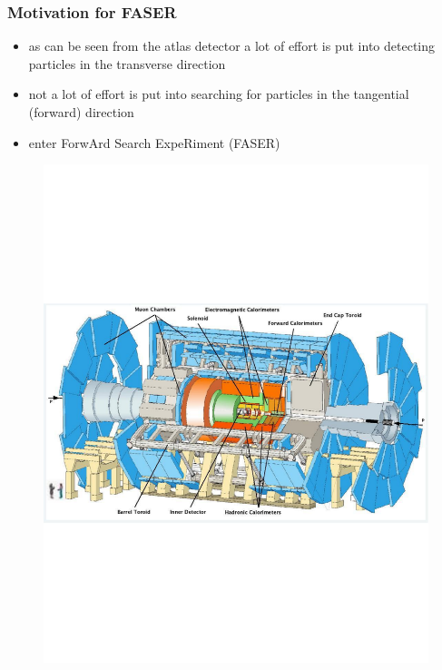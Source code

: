 \documentclass[
	11pt, %
]{beamer}
\begin{document}
\begin{frame}
\frametitle{Motivation for FASER}
	\begin{itemize}
		\item as can be seen from the atlas detector a lot of effort is put into detecting particles in the transverse direction
		\item not a lot of effort is put into searching for particles in the tangential (forward) direction
		\item enter ForwArd Search ExpeRiment (FASER)
	\end{itemize}
\begin{figure}
	\vspace*{-2cm}
	 \hspace*{0cm}
	\includegraphics[scale=.3]{atlas.pdf}
\end{figure}
\end{frame}
\end{document}
